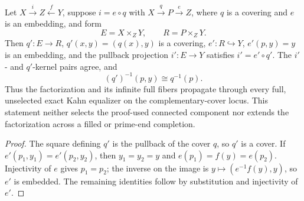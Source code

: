 \begin{proposition}\label{prop:base-change}
Let \(X\xrightarrow{i}Z\xleftarrow{f}Y\), suppose \(i=e\circ q\) with \(X\xrightarrow{q}P\xrightarrow{e}Z\), where \(q\) is a covering and \(e\) is an embedding, and form
\[
E=X\times_Z Y,\qquad R=P\times_Z Y .
\]
Then \(q':E\to R\), \(q'(x,y)=(q(x),y)\) is a covering, \(e':R\hookrightarrow Y\), \(e'(p,y)=y\) is an embedding, and the pullback projection \(i':E\to Y\) satisfies \(i'=e'\circ q'\). The \(i'\)- and \(q'\)-kernel pairs agree, and
\[
(q')^{-1}(p,y)\cong q^{-1}(p).
\]
Thus the factorization and its infinite full fibers propagate through every full, unselected exact Kahn equalizer on the complementary-cover locus. This statement neither selects the proof-used connected component nor extends the factorization across a filled or prime-end completion.
\end{proposition}

\begin{proof}
The square defining \(q'\) is the pullback of the cover \(q\), so \(q'\) is a cover. If \(e'(p_1,y_1)=e'(p_2,y_2)\), then \(y_1=y_2=y\) and \(e(p_1)=f(y)=e(p_2)\). Injectivity of \(e\) gives \(p_1=p_2\); the inverse on the image is \(y\mapsto(e^{-1}f(y),y)\), so \(e'\) is embedded. The remaining identities follow by substitution and injectivity of \(e'\).
\end{proof}